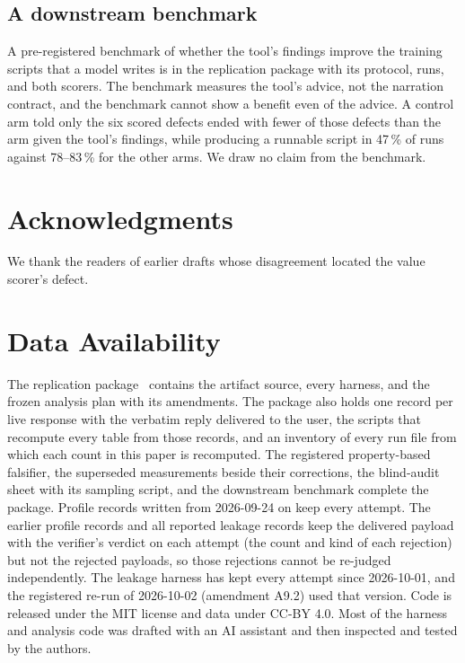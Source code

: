 \documentclass[journal]{IEEEtran}
\begin{document}
\subsection{A downstream benchmark}\label{app:benchmark}
A pre-registered benchmark of whether the tool's findings improve the training
scripts that a model writes is in the replication package with its protocol,
runs, and both scorers. The benchmark measures the tool's advice, not the
narration contract, and the benchmark cannot show a benefit even of the
advice. A control arm told only the six scored defects ended with fewer of
those defects than the arm given the tool's findings, while producing a
runnable script in 47\,\% of runs against 78--83\,\% for the other arms. We draw no claim from
the benchmark.

\section*{Acknowledgments}
We thank the readers of earlier drafts whose disagreement located the value
scorer's defect.



\section*{Data Availability}
The replication package~\cite{replication} contains the artifact source,
every harness, and the frozen analysis plan with its amendments. The package
also holds one record per live response with the verbatim reply delivered to
the user, the scripts that recompute every table from those records, and an
inventory of every run file from which each count in this paper is
recomputed. The registered property-based falsifier, the superseded
measurements beside their corrections, the blind-audit sheet with its sampling
script, and the downstream benchmark complete the package.
Profile records written from 2026-09-24 on keep every attempt. The earlier
profile records and all reported leakage records keep the delivered payload
with the verifier's verdict on each attempt (the count and kind of each
rejection) but not the rejected payloads, so those rejections cannot be
re-judged independently. The leakage harness has kept every attempt since
2026-10-01, and the registered re-run of 2026-10-02 (amendment A9.2) used that
version. Code is released under the MIT
license and data under CC-BY 4.0. Most of the harness and analysis code was
drafted with an AI assistant and then inspected and tested by the authors.


\balance


\end{document}
